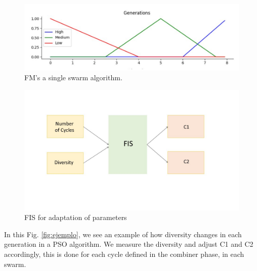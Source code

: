 \documentclass[graybox]{svmult}
\begin{document}
\begin{figure} [htbp]
  \centering
  \includegraphics[angle=0,width=1\textwidth]{FM generation.pdf}
  \caption{FM's a single swarm algorithm.}
  \label{fig:generation} 
\end{figure}

\begin{figure}[htbp]
  \centering
  \includegraphics[angle=0,width=1\textwidth]{FIS.pdf}
  \caption{FIS for adaptation of parameters}
  \label{fig:fis} 
\end{figure}

In this Fig. \ref{fig:ejemplo}, we see an example of how diversity changes in each generation in a PSO algorithm. We measure the diversity and adjust C1 and C2 accordingly, this is done for each cycle defined in the combiner phase, in each swarm.
\end{document}
